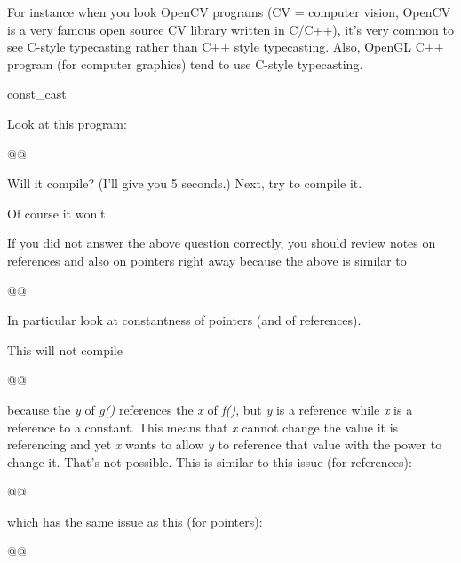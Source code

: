 \documentclass[
]{article}
\begin{document}
For instance when you look OpenCV programs (CV = computer vision, OpenCV
is a very famous open source CV library written in C/C++), it's very
common to see C-style typecasting rather than C++ style typecasting.
Also, OpenGL C++ program (for computer graphics) tend to use C-style
typecasting.

const\_cast

Look at this program:

\begin{longtable}[]{@{}@{}}
\toprule\noalign{}
\endhead
\bottomrule\noalign{}
\endlastfoot
\end{longtable}

Will it compile? (I'll give you 5 seconds.) Next, try to compile it.

Of course it won't.

If you did not answer the above question correctly, you should review
notes on references and also on pointers right away because the above is
similar to

\begin{longtable}[]{@{}@{}}
\toprule\noalign{}
\endhead
\bottomrule\noalign{}
\endlastfoot
\end{longtable}

In particular look at constantness of pointers (and of references).

This will not compile

\begin{longtable}[]{@{}@{}}
\toprule\noalign{}
\endhead
\bottomrule\noalign{}
\endlastfoot
\end{longtable}

because the \emph{y} of \emph{g()} references the \emph{x} of
\emph{f()}, but\emph{ y} is a reference while \emph{x} is a reference to
a constant. This means that \emph{x} cannot change the value it is
referencing and yet \emph{x} wants to allow \emph{y} to reference that
value with the power to change it. That's not possible. This is similar
to this issue (for references):

\begin{longtable}[]{@{}@{}}
\toprule\noalign{}
\endhead
\bottomrule\noalign{}
\endlastfoot
\end{longtable}

which has the same issue as this (for pointers):

\begin{longtable}[]{@{}@{}}
\toprule\noalign{}
\endhead
\bottomrule\noalign{}
\endlastfoot
\end{longtable}
\end{document}
